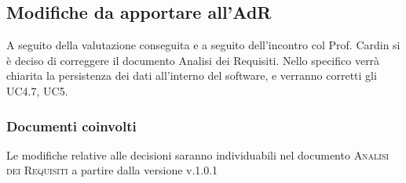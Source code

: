 \documentclass{article}
\begin{document}
\subsection{Modifiche da apportare all’AdR}
\label{itm:3}

A seguito della valutazione conseguita e a seguito dell’incontro col Prof. Cardin si è deciso di correggere il documento Analisi dei Requisiti. Nello specifico verrà chiarita la persistenza dei dati all’interno del software, e verranno corretti gli UC4.7, UC5. \\
\subsubsection*{Documenti coinvolti} 
Le modifiche relative alle decisioni saranno individuabili nel documento \textsc{Analisi dei Requisiti} a partire dalla versione v.1.0.1
\end{document}
